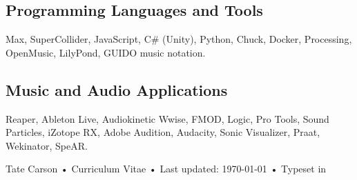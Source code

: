 \documentclass[12pt, a4paper]{article}
\begin{document}
\subsection*{Programming Languages and Tools}
Max, SuperCollider, JavaScript, C\# (Unity), Python, Chuck, Docker, Processing, OpenMusic, LilyPond, GUIDO music notation. \\

\subsection*{Music and Audio Applications}
Reaper, Ableton Live, Audiokinetic Wwise, FMOD, Logic, Pro Tools, Sound Particles, iZotope RX, Adobe Audition, Audacity, Sonic Visualizer, Praat, Wekinator, SpeAR. \\



\vfill{}

\begin{center}
{\scriptsize  Tate Carson •\- Curriculum Vitae •\- Last updated: \today\- •\- %
Typeset in \href{http://nitens.org/taraborelli/cvtex}{
\XeTeX }\\
}
\end{center}
\end{document}
